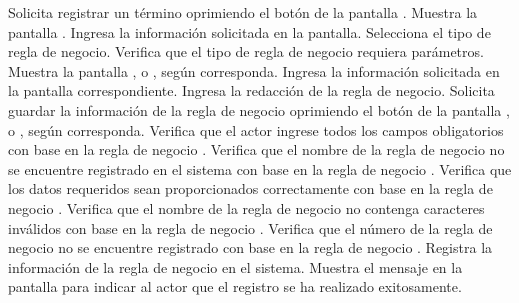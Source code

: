 	\begin{UCtrayectoria}
		\UCpaso[\UCactor] Solicita registrar un término oprimiendo el botón  de la pantalla .
		\UCpaso[\UCsist] Muestra la pantalla .
		\UCpaso[\UCactor] Ingresa la información solicitada en la pantalla. \label{CU8.1-P3}
		\UCpaso[\UCactor] Selecciona el tipo de regla de negocio.
		\UCpaso[\UCsist] Verifica que el tipo de regla de negocio requiera parámetros. 
		\UCpaso[\UCsist] Muestra la pantalla ,  o , según corresponda.
		\UCpaso[\UCsist] Ingresa la información solicitada en la pantalla correspondiente.
		\UCpaso[\UCsist] Ingresa la redacción de la regla de negocio. \label{CU8.1-P9}
		\UCpaso[\UCactor] Solicita guardar la información de la regla de negocio oprimiendo el botón  de la pantalla ,  o , según corresponda. 
		\UCpaso[\UCsist] Verifica que el actor ingrese todos los campos obligatorios con base en la regla de negocio . 
		\UCpaso[\UCsist] Verifica que el nombre de la regla de negocio no se encuentre registrado en el sistema con base en la regla de negocio . 
		\UCpaso[\UCsist] Verifica que los datos requeridos sean proporcionados correctamente con base en la regla de negocio . 
		\UCpaso[\UCsist] Verifica que el nombre de la regla de negocio no contenga caracteres inválidos con base en la regla de negocio . 
		\UCpaso[\UCsist] Verifica que el número de la regla de negocio no se encuentre registrado con base en la regla de negocio . 
		\UCpaso[\UCsist] Registra la información de la regla de negocio en el sistema.
		\UCpaso[\UCsist] Muestra el mensaje  en la pantalla  para indicar al actor que el registro se ha realizado exitosamente.
	\end{UCtrayectoria}		
	
